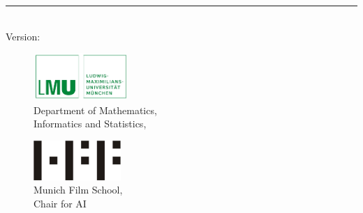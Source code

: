 %
\begin{titlepage}
	\flushright
	\hfill
	\vfill
	{\LARGE\thesisTitle \par}
	\rule[5pt]{\textwidth}{.4pt} \par
	{\Large\thesisName}
	\vfill
	\textit{\large\thesisDate} \\
	Version: \thesisVersion
\end{titlepage}


\begin{titlepage}
	\tgherosfont
	
	
	\begin{figure}
	\begin{minipage}[t]{8.5cm}		
	\includegraphics[height=1.8cm,width=3.6cm]{gfx/lmulogo.pdf}\\
	\textsf{\small{Department of Mathematics,  \\ Informatics and Statistics, \\
		\thesisUniversityInstitute
		}}
	\end{minipage}
	\hfill
	\begin{minipage}[t]{3.7cm}
	\includegraphics[height=1.5cm]{gfx/hff-logo-small.jpeg}\\
	\textsf{\small{Munich Film School, \\ Chair for AI}}
	\end{minipage}
	\end{figure}
	
	\centering


\end{titlepage}
